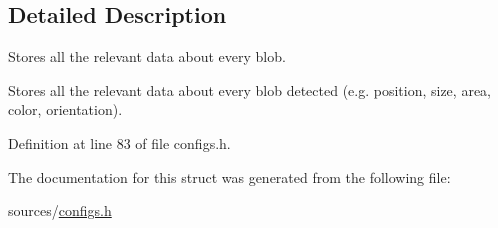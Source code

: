 \subsection{Detailed Description}
Stores all the relevant data about every blob. 

Stores all the relevant data about every blob detected (e.\-g. position, size, area, color, orientation). 

Definition at line 83 of file configs.\-h.



The documentation for this struct was generated from the following file\-:\begin{DoxyCompactItemize}
\item 
sources/\hyperlink{configs_8h}{configs.\-h}\end{DoxyCompactItemize}

